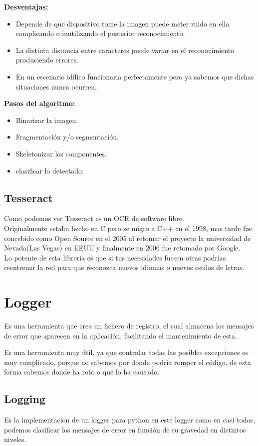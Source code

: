 \textbf{Desventajas:}
\begin{itemize}
\item Depende de que dispositivo tome la imagen puede meter ruido en ella complicando o inutilizando el posterior reconocimiento.
\item La distinta distancia entre caracteres puede variar en el reconocimiento produciendo errores.
\item En un escenario idílico funcionaria perfectamente pero ya sabemos que dichas situaciones nunca ocurren.
\end{itemize}

\textbf{Pasos del algoritmo:}
\begin{itemize}
\item Binarizar la imagen.
\item Fragmentación y/o segmentación.
\item Skeletonizar los componentes.
\item clasificar lo detectado.
\end{itemize}

\subsection{Tesseract}
Como podemos ver Tesseract\cite{wiki:Tesseract} es un OCR de software libre.\\
Originalmente estaba hecho en C pero se migro a C++ en el 1998, mas tarde fue concebido como Open Source en el 2005 al retomar el proyecto la universidad de Nevada(Las Vegas) en EEUU y finalmente en 2006 fue retomado por Google.\\

Lo potente de esta librería es que si tus necesidades fuesen otras podrías reentrenar la red para que reconozca nuevos idiomas o nuevos estilos de letras.

\section{Logger}
Es una herramienta que crea un fichero de registro, el cual almacena los mensajes de error que aparecen en la aplicación, facilitando el mantenimiento de esta.

Es una herramienta muy útil, ya que controlar todas las posibles excepciones es muy complicado, porque no sabemos por donde podría romper el código, de esta forma sabemos donde ha roto o que lo ha causado.

\subsection{Logging}
Es la implementacion de un logger para python \cite{python:logger} en este logger como en casi todos, podemos clasificar los mensajes de error en función de su gravedad en distintos niveles.

